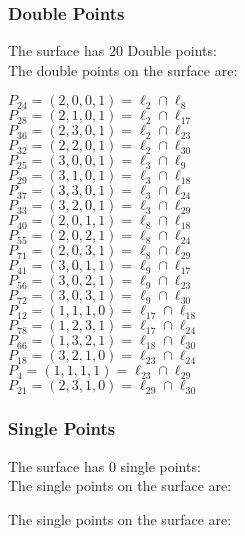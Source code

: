 \documentclass{article}
\begin{document}
{\subsubsection*{Double Points}
The surface has 20 Double points:\\
The double points on the surface are:\\
\begin{multicols}{2}
\noindent
$P_{24} = ( 2, 0, 0, 1 ) = \ell_{2} \cap \ell_{8} $\\
$P_{28} = ( 2, 1, 0, 1 ) = \ell_{2} \cap \ell_{17} $\\
$P_{36} = ( 2, 3, 0, 1 ) = \ell_{2} \cap \ell_{23} $\\
$P_{32} = ( 2, 2, 0, 1 ) = \ell_{2} \cap \ell_{30} $\\
$P_{25} = ( 3, 0, 0, 1 ) = \ell_{3} \cap \ell_{9} $\\
$P_{29} = ( 3, 1, 0, 1 ) = \ell_{3} \cap \ell_{18} $\\
$P_{37} = ( 3, 3, 0, 1 ) = \ell_{3} \cap \ell_{24} $\\
$P_{33} = ( 3, 2, 0, 1 ) = \ell_{3} \cap \ell_{29} $\\
$P_{40} = ( 2, 0, 1, 1 ) = \ell_{8} \cap \ell_{18} $\\
$P_{55} = ( 2, 0, 2, 1 ) = \ell_{8} \cap \ell_{24} $\\
$P_{71} = ( 2, 0, 3, 1 ) = \ell_{8} \cap \ell_{29} $\\
$P_{41} = ( 3, 0, 1, 1 ) = \ell_{9} \cap \ell_{17} $\\
$P_{56} = ( 3, 0, 2, 1 ) = \ell_{9} \cap \ell_{23} $\\
$P_{72} = ( 3, 0, 3, 1 ) = \ell_{9} \cap \ell_{30} $\\
$P_{12} = ( 1, 1, 1, 0 ) = \ell_{17} \cap \ell_{18} $\\
$P_{78} = ( 1, 2, 3, 1 ) = \ell_{17} \cap \ell_{24} $\\
$P_{66} = ( 1, 3, 2, 1 ) = \ell_{18} \cap \ell_{30} $\\
$P_{18} = ( 3, 2, 1, 0 ) = \ell_{23} \cap \ell_{24} $\\
$P_{4} = ( 1, 1, 1, 1 ) = \ell_{23} \cap \ell_{29} $\\
$P_{21} = ( 2, 3, 1, 0 ) = \ell_{29} \cap \ell_{30} $\\
\end{multicols}
\subsubsection*{Single Points}
The surface has 0 single points:\\
The single points on the surface are:\\
\begin{multicols}{2}
\noindent
\end{multicols}
The single points on the surface are:\\
}
\end{document}
